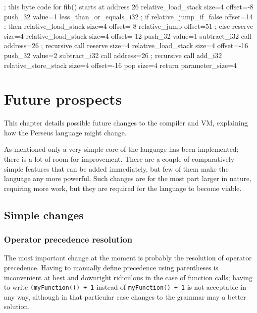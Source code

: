 \begin{codelisting}[caption="Byte code translation of function fib() in listing \ref{lst:result_language}",label={lst:result_bytecode}]
; this byte code for fib() starts at address 26
relative_load_stack size=4 offset=-8
push_32 value=1
less_than_or_equals_i32
; if
relative_jump_if_false offset=14
; then
	relative_load_stack size=4 offset=-8
	relative_jump offset=51
; else
	reserve size=4
	relative_load_stack size=4 offset=-12
	push_32 value=1
	subtract_i32
	call address=26 ; recursive call
	reserve size=4
	relative_load_stack size=4 offset=-16
	push_32 value=2
	subtract_i32
	call address=26 ; recursive call
	add_i32
relative_store_stack size=4 offset=-16
pop size=4
return parameter_size=4
\end{codelisting}

\chapter{Future prospects}
This chapter details possible future changes to the compiler and VM, explaining how the Perseus language might change.

As mentioned only a very simple core of the language has been implemented; there is a lot of room for improvement. There are a couple of comparatively simple features that can be added immediately, but few of them make the language any more powerful. Such changes are for the most part larger in nature, requiring more work, but they are required for the language to become viable.

    \section{Simple changes}
    
    	\subsection{Operator precedence resolution}
    	
    	The most important change at the moment is probably the resolution of operator precedence. Having to manually define precedence using parentheses is inconvenient at best and downright ridiculous in the case of function calls; having to write \lstinline$(myFunction()) + 1$ instead of \lstinline$myFunction() + 1$ is not acceptable in any way, although in that particular case changes to the grammar may a better solution.
		
